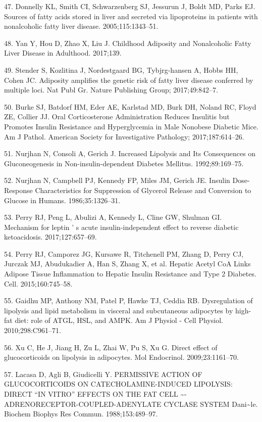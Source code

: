 \documentclass[11pt]{article} %
\begin{document}
47. Donnelly KL, Smith CI, Schwarzenberg SJ, Jessurun J, Boldt MD, Parks
EJ. Sources of fatty acids stored in liver and secreted via lipoproteins
in patients with nonalcoholic fatty liver disease. 2005;115:1343--51.

48. Yan Y, Hou D, Zhao X, Liu J. Childhood Adiposity and Nonalcoholic
Fatty Liver Disease in Adulthood. 2017;139.

49. Stender S, Kozlitina J, Nordestgaard BG, Tybjrg-hansen A, Hobbs HH,
Cohen JC. Adiposity amplifies the genetic risk of fatty liver disease
conferred by multiple loci. Nat Publ Gr. Nature Publishing Group;
2017;49:842--7.

50. Burke SJ, Batdorf HM, Eder AE, Karlstad MD, Burk DH, Noland RC,
Floyd ZE, Collier JJ. Oral Corticosterone Administration Reduces
Insulitis but Promotes Insulin Resistance and Hyperglycemia in Male
Nonobese Diabetic Mice. Am J Pathol. American Society for Investigative
Pathology; 2017;187:614--26.

51. Nurjhan N, Consoli A, Gerich J. Increased Lipolysis and Its
Consequences on Gluconeogenesis in Non-insulin-dependent Diabetes
Mellitus. 1992;89:169--75.

52. Nurjhan N, Campbell PJ, Kennedy FP, Miles JM, Gerich JE. Insulin
Dose-Response Characteristics for Suppression of Glycerol Release and
Conversion to Glucose in Humans. 1986;35:1326--31.

53. Perry RJ, Peng L, Abulizi A, Kennedy L, Cline GW, Shulman GI.
Mechanism for leptin ' s acute insulin-independent effect to reverse
diabetic ketoacidosis. 2017;127:657--69.

54. Perry RJ, Camporez JG, Kursawe R, Titchenell PM, Zhang D, Perry CJ,
Jurczak MJ, Abudukadier A, Han S, Zhang X, et al. Hepatic Acetyl CoA
Links Adipose Tissue Inflammation to Hepatic Insulin Resistance and Type
2 Diabetes. Cell. 2015;160:745--58.

55. Gaidhu MP, Anthony NM, Patel P, Hawke TJ, Ceddia RB. Dysregulation
of lipolysis and lipid metabolism in visceral and subcutaneous
adipocytes by high-fat diet: role of ATGL, HSL, and AMPK. Am J Physiol -
Cell Physiol. 2010;298:C961--71.

56. Xu C, He J, Jiang H, Zu L, Zhai W, Pu S, Xu G. Direct effect of
glucocorticoids on lipolysis in adipocytes. Mol Endocrinol.
2009;23:1161--70.

57. Lacasa D, Agli B, Giudicelli Y. PERMISSIVE ACTION OF GLUCOCORTICOIDS
ON CATECHOLAMINE-INDUCED LIPOLYSIS: DIRECT ``IN VITRO'' EFFECTS ON THE
FAT CELL \textasciitilde{}-ADRENORECEPTOR-COUPLED-ADENYLATE CYCLASE
SYSTEM Dani\textasciitilde{}le. Biochem Biophys Res Commun.
1988;153:489--97.
\end{document}
